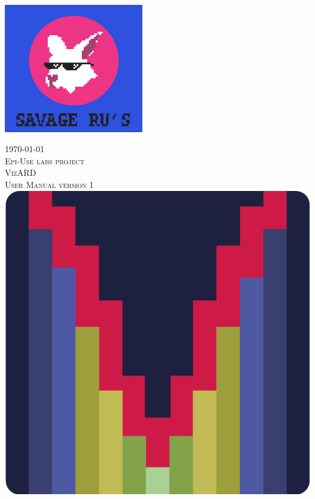 \documentclass[a4paper,12pt]{article}
\begin{document}
\begin{titlepage}
\begin{minipage}{0.4\textwidth}
\begin{flushright}
\end{flushright}

\end{minipage}\\[0.5cm]



\centering
	\includegraphics[width=60mm]{SavageRu.jpg}

{\large \today}\\[3cm] %
\newpage
\centering
	\textsc{\LARGE Epi-Use labs project}\\[0.5cm]
	\textsc{\Large VizARD}\\[0.5cm]
	\textsc{\Large User Manual version 1}\\[0.5cm]
	\includegraphics[width=\textwidth]{images/vizard.png}

\vfill %

\end{titlepage}
\end{document}
